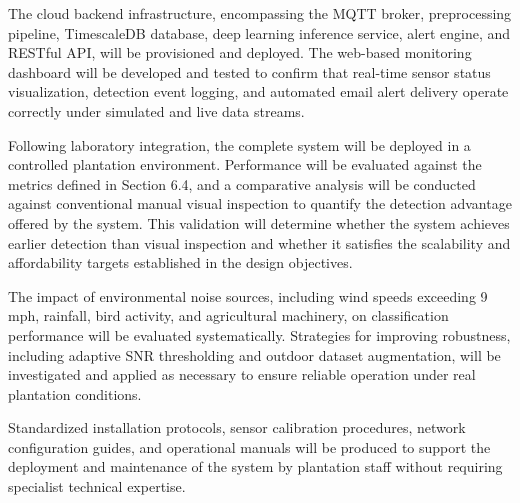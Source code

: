 \documentclass[12pt,a4paper,oneside]{memoir}
\begin{document}
The cloud backend infrastructure, encompassing the MQTT broker, preprocessing pipeline, TimescaleDB database, deep learning inference service, alert engine, and RESTful API, will be provisioned and deployed. The web-based monitoring dashboard will be developed and tested to confirm that real-time sensor status visualization, detection event logging, and automated email alert delivery operate correctly under simulated and live data streams.

Following laboratory integration, the complete system will be deployed in a controlled plantation environment. Performance will be evaluated against the metrics defined in Section 6.4, and a comparative analysis will be conducted against conventional manual visual inspection to quantify the detection advantage offered by the system. This validation will determine whether the system achieves earlier detection than visual inspection and whether it satisfies the scalability and affordability targets established in the design objectives.

The impact of environmental noise sources, including wind speeds exceeding 9 mph, rainfall, bird activity, and agricultural machinery, on classification performance will be evaluated systematically. Strategies for improving robustness, including adaptive SNR thresholding and outdoor dataset augmentation, will be investigated and applied as necessary to ensure reliable operation under real plantation conditions.

Standardized installation protocols, sensor calibration procedures, network configuration guides, and operational manuals will be produced to support the deployment and maintenance of the system by plantation staff without requiring specialist technical expertise.

\printbibliography[title=References]
\end{document}
